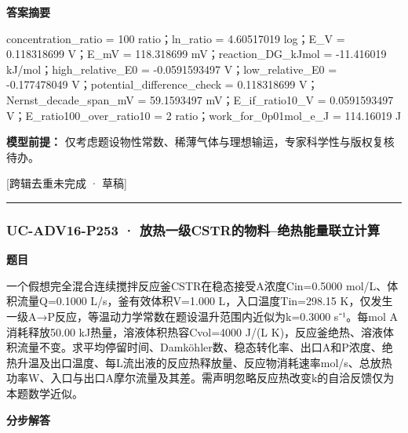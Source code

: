 \documentclass[UTF8,11pt,a4paper]{ctexart}
\begin{document}
\noindent\textbf{答案摘要}\par
concentration\_ratio = 100 ratio；ln\_ratio = 4.60517019 log；E\_V = 0.118318699 V；E\_mV = 118.318699 mV；reaction\_DG\_kJmol = -11.416019 kJ/mol；high\_relative\_E0 = -0.0591593497 V；low\_relative\_E0 = -0.177478049 V；potential\_difference\_check = 0.118318699 V；Nernst\_decade\_span\_mV = 59.1593497 mV；E\_if\_ratio10\_V = 0.0591593497 V；E\_ratio100\_over\_ratio10 = 2 ratio；work\_for\_0p01mol\_e\_J = 114.16019 J\par
\noindent\textbf{模型前提：}
仅考虑题设物性常数、稀薄气体与理想输运，专家科学性与版权复核待办。\par
\noindent\textcolor{red!65!black}{[跨辑去重未完成 · 草稿]} \par
\medskip\hrule\medskip
{}
\subsubsection*{UC-ADV16-P253 · 放热一级CSTR的物料–绝热能量联立计算}
\noindent\textbf{题目}\par
一个假想完全混合连续搅拌反应釜CSTR在稳态接受A浓度Cin=0.5000 mol/L、体积流量Q=0.1000 L/s，釜有效体积V=1.000 L，入口温度Tin=298.15 K，仅发生一级A→P反应，等温动力学常数在题设温升范围内近似为k=0.3000 s⁻¹。每mol A消耗释放50.00 kJ热量，溶液体积热容Cvol=4000 J/(L K)，反应釜绝热、溶液体积流量不变。求平均停留时间、Damköhler数、稳态转化率、出口A和P浓度、绝热升温及出口温度、每L流出液的反应热释放量、反应物消耗速率mol/s、总放热功率W、入口与出口A摩尔流量及其差。需声明忽略反应热改变k的自洽反馈仅为本题数学近似。\par
\medskip\noindent\textbf{分步解答}
\end{document}
